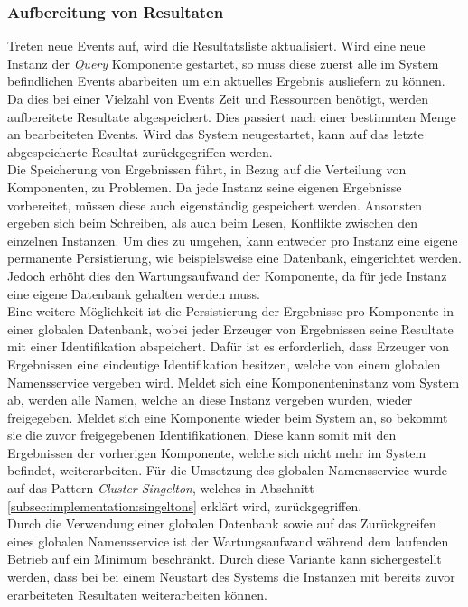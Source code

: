 \subsubsection{Aufbereitung von Resultaten}
\label{subsubsub:implementation:queryActorModel:resultPreparator}
Treten neue Events auf, wird die Resultatsliste aktualisiert. Wird eine neue Instanz der \textit{Query} Komponente gestartet, so muss diese zuerst alle im System befindlichen Events abarbeiten um ein aktuelles Ergebnis ausliefern zu können. Da dies bei einer Vielzahl von Events Zeit und Ressourcen benötigt, werden aufbereitete Resultate abgespeichert. Dies passiert nach einer bestimmten Menge an bearbeiteten Events. Wird das System neugestartet, kann auf das letzte abgespeicherte Resultat zurückgegriffen werden.\\
Die Speicherung von Ergebnissen führt, in Bezug auf die Verteilung von Komponenten, zu Problemen. Da jede Instanz seine eigenen Ergebnisse vorbereitet, müssen diese auch eigenständig gespeichert werden. Ansonsten ergeben sich beim Schreiben, als auch beim Lesen, Konflikte zwischen den einzelnen Instanzen. Um dies zu umgehen, kann entweder pro Instanz eine eigene permanente Persistierung, wie beispielsweise eine Datenbank, eingerichtet werden. Jedoch erhöht dies den Wartungsaufwand der Komponente, da für jede Instanz eine eigene Datenbank gehalten werden muss. \\
Eine weitere Möglichkeit ist die Persistierung der Ergebnisse pro Komponente in einer globalen Datenbank, wobei jeder Erzeuger von Ergebnissen seine Resultate mit einer Identifikation abspeichert. Dafür ist es  erforderlich, dass Erzeuger von Ergebnissen eine eindeutige Identifikation besitzen, welche von einem globalen Namensservice vergeben wird. Meldet sich eine Komponenteninstanz vom System ab, werden alle Namen, welche an diese Instanz vergeben wurden, wieder freigegeben. Meldet sich eine Komponente wieder beim System an, so bekommt sie die  zuvor freigegebenen Identifikationen. Diese kann somit mit den Ergebnissen der vorherigen Komponente, welche sich nicht  mehr im System befindet, weiterarbeiten. Für die Umsetzung des globalen Namensservice wurde auf das Pattern \textit{Cluster Singelton}, welches in Abschnitt \ref{subsec:implementation:singeltons} erklärt wird, zurückgegriffen. \\
Durch die Verwendung einer globalen Datenbank sowie auf das Zurückgreifen eines globalen Namensservice ist der Wartungsaufwand während dem laufenden Betrieb  auf ein Minimum beschränkt. Durch diese Variante kann sichergestellt werden, dass bei bei einem Neustart des Systems die Instanzen mit bereits zuvor erarbeiteten Resultaten weiterarbeiten können. 

